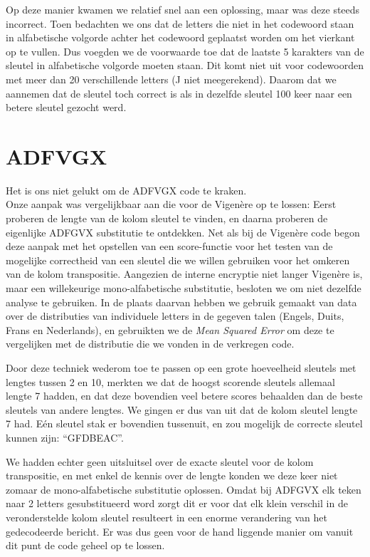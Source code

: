 \documentclass[fleqn]{article}
\begin{document}
	Op deze manier kwamen we relatief snel aan een oplossing, maar was deze steeds incorrect. Toen bedachten we ons dat de letters die niet in het codewoord staan in alfabetische volgorde achter het codewoord geplaatst worden om het vierkant op te vullen. Dus voegden we de voorwaarde toe dat de laatste 5 karakters van de sleutel in alfabetische volgorde moeten staan. Dit komt niet uit voor codewoorden met meer dan 20 verschillende letters (J niet meegerekend). Daarom dat we aannemen dat de sleutel toch correct is als in dezelfde sleutel 100 keer naar een betere sleutel gezocht werd.
	\section{ADFVGX}
	Het is ons niet gelukt om de ADFVGX code te kraken.\\
	Onze aanpak was vergelijkbaar aan die voor de Vigen\`ere op te lossen: Eerst proberen de lengte van de kolom sleutel te vinden, en daarna proberen de eigenlijke ADFGVX substitutie te ontdekken. Net als bij de Vigen\`ere code begon deze aanpak met het opstellen van een score-functie voor het testen van de mogelijke correctheid van een sleutel die we willen gebruiken voor het omkeren van de kolom transpositie. Aangezien de interne encryptie niet langer Vigen\`ere is, maar een willekeurige mono-alfabetische substitutie, besloten we om niet dezelfde analyse te gebruiken. In de plaats daarvan hebben we gebruik gemaakt van data over de distributies van individuele letters in de gegeven talen (Engels, Duits, Frans en Nederlands), en gebruikten we de \textit{Mean Squared Error} om deze te vergelijken met de distributie die we vonden in de verkregen code.
	
	Door deze techniek wederom toe te passen op een grote hoeveelheid sleutels met lengtes tussen 2 en 10, merkten we dat de hoogst scorende sleutels allemaal lengte 7 hadden, en dat deze bovendien veel betere scores behaalden dan de beste sleutels van andere lengtes. We gingen er dus van uit dat de kolom sleutel lengte 7 had. E\'en sleutel stak er bovendien tussenuit, en zou mogelijk de correcte sleutel kunnen zijn: ``GFDBEAC''.
	
	We hadden echter geen uitsluitsel over de exacte sleutel voor de kolom transpositie, en met enkel de kennis over de lengte konden we deze keer niet zomaar de mono-alfabetische substitutie oplossen. Omdat bij ADFGVX elk teken naar 2 letters gesubstitueerd word zorgt dit er voor dat elk klein verschil in de veronderstelde kolom sleutel resulteert in een enorme verandering van het gedecodeerde bericht. Er was dus geen voor de hand liggende manier om vanuit dit punt de code geheel op te lossen.
	
\end{document}
